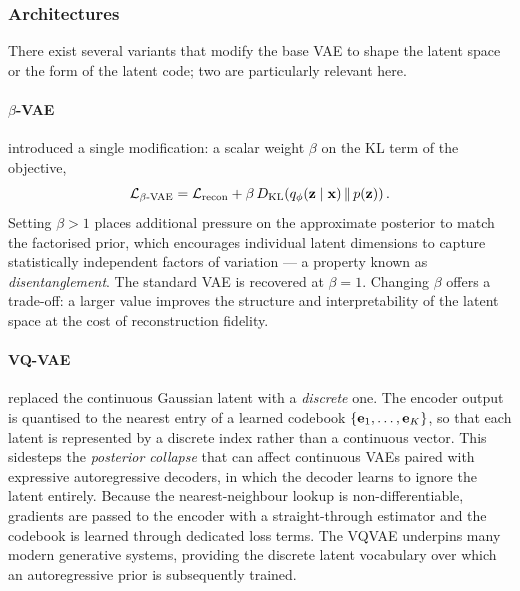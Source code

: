 \subsubsection{Architectures} \label{sec:background:ae:vae:arch}
There exist several variants that modify the base \ac{VAE} to shape the latent
space or the form of the latent code; two are particularly relevant here.

    \paragraph{$\beta$-VAE} \citet{higginsBetaVAELearningBasic2017} introduced a
    single modification: a scalar weight $\beta$ on the \ac{KL} term of the
    objective,
    \begin{equation} \label{eq:background:ae:vae:beta-loss}
        \mathcal{L}_{\beta\text{-VAE}} = \mathcal{L}_{\mathrm{recon}} + \beta \,
        D_{\mathrm{KL}}\!\left(q_{\phi}(\vb{z} \mid \vb{x}) \,\middle\|\, p(\vb{z})\right).
    \end{equation}
    Setting $\beta > 1$ places additional pressure on the approximate posterior
    to match the factorised prior, which encourages individual latent dimensions
    to capture statistically independent factors of variation --- a property
    known as \textit{disentanglement}. The standard \ac{VAE} is recovered at
    $\beta = 1$. Changing $\beta$ offers a trade-off: a larger value improves
    the structure and interpretability of the latent space at the cost of
    reconstruction fidelity.

    \paragraph{VQ-VAE}
    \citet{vandenoordNeuralDiscreteRepresentation2017}
    replaced the continuous Gaussian latent with a \textit{discrete} one. The
    encoder output is quantised to the nearest entry of a learned codebook
    $\{\vb{e}_{1}, \dots, \vb{e}_{K}\}$, so that each latent is represented by a
    discrete index rather than a continuous vector. This sidesteps the
    \textit{posterior collapse} that can affect continuous \acp{VAE} paired with
    expressive autoregressive decoders, in which the decoder learns to ignore
    the latent entirely. Because the nearest-neighbour lookup is
    non-differentiable, gradients are passed to the encoder with a
    straight-through estimator and the codebook is learned through dedicated
    loss terms. The \ac{VQVAE} underpins many modern generative systems,
    providing the discrete latent vocabulary over which an autoregressive prior
    is subsequently trained.

